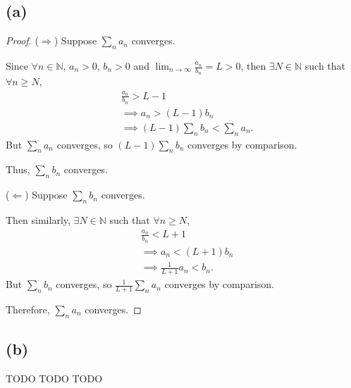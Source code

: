 \documentclass{article}
\newcommand{\N}{\mathbb{N}} %
\begin{document}
\subsection*{(a)}
\begin{proof}
	($\Rightarrow$) Suppose $\sum_n a_n$ converges. 
	
	Since $\forall n \in \N$, $a_n > 0$, $b_n > 0$ and $\lim_{n \to \infty} \frac{a_n}{b_n} = L >0$, then $\exists N \in \N$ such that $\forall n \geq N$,
	\begin{align}
		&\frac{a_n}{b_n} > L - 1 \\
		&\implies a_n > (L-1)b_n \\
		&\implies (L-1)\sum_n b_n < \sum_n a_n.
	\end{align}
	But $\sum_n a_n$ converges, so $(L-1)\sum_n b_n$ converges by comparison.
	
	Thus, $\sum_n b_n$ converges.
	
	($\Leftarrow$) Suppose $\sum_n b_n$ converges.
	
	Then similarly, $\exists N \in \N$ such that $\forall n \geq N$, 
	\begin{align}
		&\frac{a_n}{b_n} < L + 1 \\
		&\implies a_n < (L+1)b_n \\
		&\implies \frac{1}{L+1}a_n < b_n.
	\end{align}
	But $\sum_n b_n$ converges, so $\frac{1}{L+1}\sum_n a_n$ converges by comparison.
	
	Therefore, $\sum_n a_n$ converges.
\end{proof}

\subsection*{(b)}
TODO TODO TODO 
\end{document}
